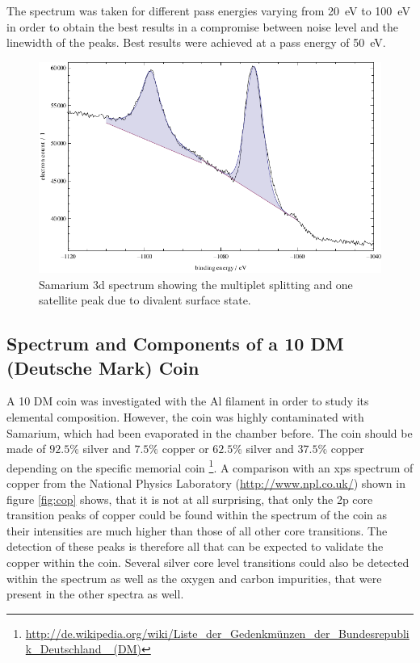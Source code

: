 \documentclass[a4paper]{scrartcl}
\numberwithin{equation}{section}
\numberwithin{figure}{section}
\numberwithin{table}{section}
\begin{document}
The spectrum was taken for different pass energies varying from \SI{20}{eV} to \SI{100}{eV} in order to obtain the best results in a compromise between noise level and the linewidth of the peaks. Best results were achieved at a pass energy of \SI{50}{eV}.  
\begin{figure}
  \centering
   	\includegraphics[width=\linewidth]{img/3d.pdf}
 \caption{\small Samarium 3d spectrum showing the multiplet splitting and one satellite peak due to divalent surface state. }
        \label{3d}
\end{figure}






\clearpage
\subsection{Spectrum and Components of a 10 DM (Deutsche Mark) Coin}
A 10 DM coin was investigated with the Al filament in order to study its elemental composition. However, the coin was highly contaminated with Samarium, which had been evaporated in the chamber before. The coin should be made of $92.5 \%$ silver and $7.5\%$ copper or $62.5 \%$ silver and $37.5 \%$ copper depending on the specific memorial coin \footnote{\url{http://de.wikipedia.org/wiki/Liste_der_Gedenkmünzen_der_Bundesrepublik_Deutschland _(DM)}}. A comparison with an xps spectrum of copper from the National Physics Laboratory (\url{http://www.npl.co.uk/}) shown in figure \ref{fig:cop} shows, that it is not at all surprising, that only the 2p core transition peaks of copper could be found within the spectrum of the coin as their intensities are much higher than those of all other core transitions. The detection of these peaks is therefore all that can be expected to validate the copper within the coin. Several silver core level transitions could also be detected within the spectrum as well as the oxygen and carbon impurities, that were present in the other spectra as well.
\end{document}

